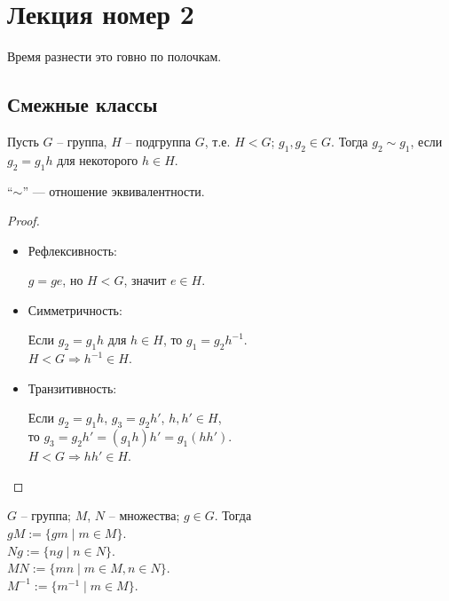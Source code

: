 \section{Лекция номер 2}

Время разнести это говно по полочкам.

\subsection{Смежные классы}

\begin{conj}
    Пусть $G$ -- группа, $H$ -- подгруппа $G$, т.е. $H < G$;
    $g_1, g_2 \in G$. Тогда $g_2 \sim g_1$, если $g_2 = g_1 h$ для
    некоторого $h \in H$.
\end{conj}

\begin{theorem}
    ``$\sim$'' --- отношение эквивалентности.
\end{theorem}
\begin{proof} $ $

    \begin{itemize}
        \item Рефлексивность:
        
        $g = ge$, но $H < G$, значит $e \in H$.

        \item Симметричность:
        
        Если $g_2 = g_1 h$ для $h \in H$, то $g_1 = g_2 h^{-1}$. \\
        $H < G \Rightarrow h^{-1} \in H$.

        \item Транзитивность:
        
        Если $g_2 = g_1 h$, $g_3 = g_2 h'$, $h, h' \in H$, \\
        то $g_3 = g_2 h' = (g_1 h) h' = g_1 (hh')$. \\
        $H < G \Rightarrow hh' \in H$.

    \end{itemize}
\end{proof}

\begin{conj} $ $\\
    $G$ -- группа; $M$, $N$ -- множества; $g \in G$. Тогда \\
    $gM := \{ gm \mid m \in M \}$. \\
    $Ng := \{ ng \mid n \in N \}$. \\
    $MN := \{ mn \mid m \in M, n \in N \}$. \\
    $M^{-1} := \{ m^{-1} \mid m \in M \}$.
\end{conj}


